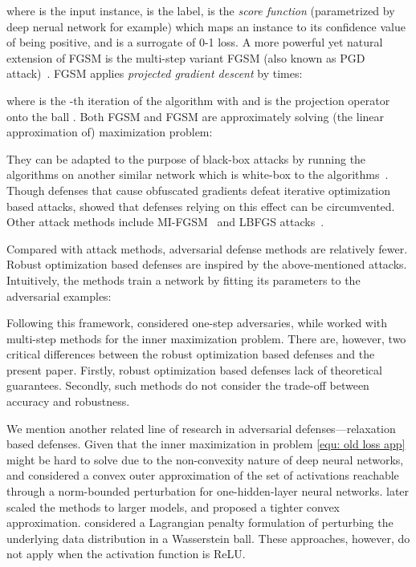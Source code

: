 \documentclass[11pt]{article}
\newcommand{\0}{\mathbf{0}}
\newcommand{\1}{\mathbf{1}}
\begin{document}
where  is the input instance,  is the label,  is the \emph{score function} (parametrized by deep nerual network for example) which maps an instance to its confidence value of being positive, and  is a surrogate of 0-1 loss. A more powerful yet natural extension of FGSM is the multi-step variant FGSM (also known as PGD attack)~\cite{kurakin2016adversarial}. FGSM applies \emph{projected gradient descent} by  times:

where  is the -th iteration of the algorithm with  and  is the projection operator onto the ball .
Both FGSM and FGSM are approximately solving (the linear approximation of) maximization problem:

They can be adapted to the purpose of black-box attacks by running the algorithms on another similar network which is white-box to the algorithms~\cite{tramer2017ensemble}. Though defenses that cause obfuscated
gradients defeat iterative optimization based attacks, \cite{athalye2018obfuscated} showed that defenses relying on this
effect can be circumvented. Other attack methods include MI-FGSM~\cite{dong2018boosting} and LBFGS attacks~\cite{tabacof2016exploring}.

\medskip
{} Compared with attack methods, adversarial defense methods are relatively fewer. Robust optimization based defenses are inspired by the above-mentioned attacks. Intuitively, the methods train a network by fitting its parameters to the adversarial examples:

Following this framework, \cite{huang2015learning,shaham2015understanding}  considered one-step adversaries, while \cite{madry2018towards} worked with multi-step methods for the inner maximization problem.
There are, however, two critical differences between the robust optimization based defenses
and the present paper. Firstly, robust optimization based defenses lack of theoretical guarantees. Secondly, such methods do not consider the trade-off between accuracy and robustness.

\medskip
{} We mention another related line of research in adversarial defenses---relaxation based defenses. Given that the inner maximization in problem \eqref{equ: old loss app} might be hard to solve due to the non-convexity nature of deep neural networks, \cite{kolter2017provable} and \cite{raghunathan2018certified} considered a convex outer approximation of the set of activations reachable through a norm-bounded perturbation for one-hidden-layer neural networks. \cite{wong1805scaling} later scaled the methods to larger models, and \cite{raghunathan2018semidefinite} proposed a tighter convex approximation. \cite{sinha2017certifiable,NIPS2018_7779} considered a Lagrangian penalty formulation of perturbing the underlying data distribution in a Wasserstein ball. These approaches, however, do not apply when the activation function is ReLU.
\end{document}
